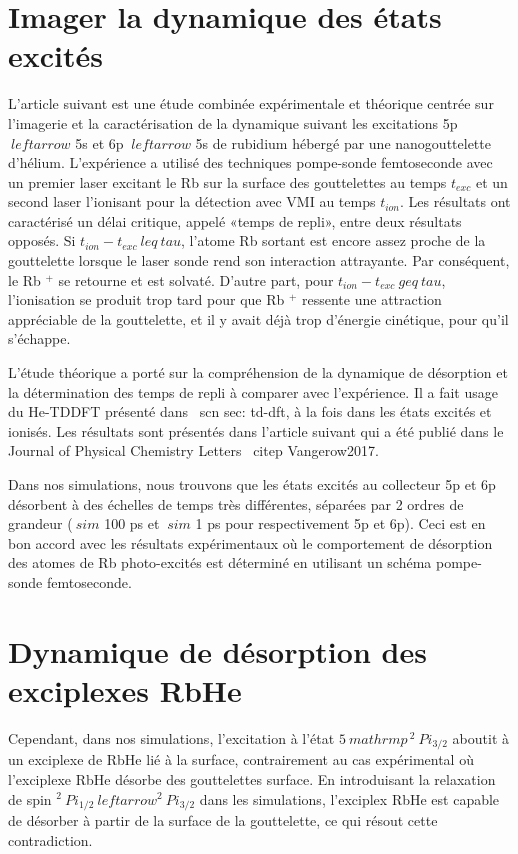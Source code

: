 	\section*{Imager la dynamique des états excités}	
		L'article suivant est une étude combinée expérimentale et théorique centrée sur l'imagerie et la caractérisation de la dynamique suivant les excitations 5p $ \ leftarrow $ 5s et 6p $ \ leftarrow $ 5s de rubidium hébergé par une nanogouttelette d'hélium. L'expérience a utilisé des techniques pompe-sonde femtoseconde avec un premier laser excitant le Rb sur la surface des gouttelettes au temps $ t_ {exc} $ et un second laser l'ionisant pour la détection avec VMI au temps $ t_ {ion} $. Les résultats ont caractérisé un délai critique, appelé «temps de repli», entre deux résultats opposés. Si $ t_ {ion} -t_ {exc} \ leq \ tau $, l'atome Rb sortant est encore assez proche de la gouttelette lorsque le laser sonde rend son interaction attrayante. Par conséquent, le Rb $ ^ + $ se retourne et est solvaté. D'autre part, pour $ t_ {ion} -t_ {exc} \ geq \ tau $, l'ionisation se produit trop tard pour que Rb $ ^ + $ ressente une attraction appréciable de la gouttelette, et il y avait déjà trop d'énergie cinétique, pour qu'il s'échappe.
		
		L'étude théorique a porté sur la compréhension de la dynamique de désorption et la détermination des temps de repli à comparer avec l'expérience. Il a fait usage du He-TDDFT présenté dans \ scn {sec: td-dft}, à la fois dans les états excités et ionisés. Les résultats sont présentés dans l'article suivant qui a été publié dans le Journal of Physical Chemistry Letters \ citep {Vangerow2017}.
		
		Dans nos simulations, nous trouvons que les états excités au collecteur 5p et 6p désorbent à des échelles de temps très différentes, séparées par 2 ordres de grandeur ($ \ sim $ 100 ps et $ \ sim $ 1 ps pour respectivement 5p et 6p). Ceci est en bon accord avec les résultats expérimentaux où le comportement de désorption des atomes de Rb photo-excités est déterminé en utilisant un schéma pompe-sonde femtoseconde. 

	\section*{Dynamique de désorption des exciplexes RbHe}
		Cependant, dans nos simulations, l'excitation à l'état $ 5 \ mathrm {p} \, ^ 2 \ Pi_ {3/2} $ aboutit à un exciplexe de RbHe lié à la surface, contrairement au cas expérimental où l'exciplexe RbHe désorbe des gouttelettes surface. En introduisant la relaxation de spin $ ^ 2 \ Pi_ {1/2} \ leftarrow {^ 2} \ Pi_ {3/2} $ dans les simulations, l'exciplex RbHe est capable de désorber à partir de la surface de la gouttelette, ce qui résout cette contradiction.
		
